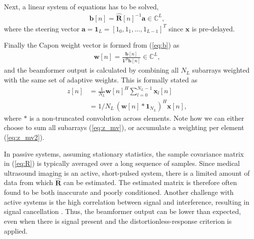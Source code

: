 \documentclass[journal]{IEEEtran}
\newcommand{\mat}[1]{\mathbf{#1}}
\renewcommand{\vec}[1]{\mathbf{#1}}
\begin{document}
Next, a linear system of equations has to be solved,
\begin{align}\label{eq:b}
\vec{b}[n] = \mat{\hat{R}}[n]^{-1}\vec{a} \in \mathbb{C}^L,
\end{align}
where the steering vector $\vec{a} = \vec{1}_L = [1_0, 1_1, ..., 1_{L-1}]^T$ since $\vec{x}$ is pre-delayed. 

Finally the Capon weight vector is formed from (\ref{eq:b}) as
\begin{align}\label{eq:w}
\vec{w}[n] = \frac{\vec{b}[n]}{\vec{1}^H\vec{b}[n]} \in \mathbb{C}^L,
\end{align}
and the beamformer output is calculated by combining all $N_L$ subarrays weighted with the same set of adaptive weights. This is formally stated as
\begin{align}
z[n] &= \frac{1}{N_L}\vec{w}[n]^H \sum_{l=0}^{N_L-1} \vec{x}_l[n] \label{eq:z_mv}\\
&= 1/N_L \, (\vec{w}[n] * \vec{1}_{N_L})^H\vec{x}[n] \label{eq:z_mv2},
\end{align}
where $*$ is a non-truncated convolution across elements.
Note how we can either choose to sum all subarrays (\ref{eq:z_mv}), or accumulate a weighting per element (\ref{eq:z_mv2}).

In passive systems, assuming stationary statistics, the sample covariance matrix in (\ref{eq:R}) is typically averaged over a long sequence of samples\cite{Krima}. Since medical ultrasound imaging is an active, short-pulsed system, there is a limited amount of data from which $\mat{\hat{R}}$ can be estimated. The estimated matrix is therefore often found to be both inaccurate and poorly conditioned. Another challenge with active systems is the high correlation between signal and interference, resulting in signal cancellation \cite{Reddy1987}. Thus, the beamformer output can be lower than expected, even when there is signal present and the distortionless-response criterion is applied. 
\end{document}
